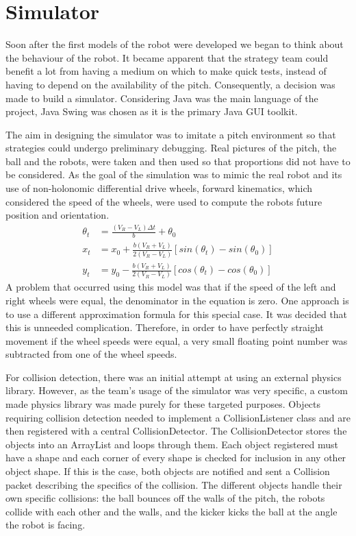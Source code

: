 \section{Simulator}

Soon after the first models of the robot were developed we began to think about the behaviour of the robot. It became apparent that the strategy team could benefit a lot from having a medium on which to make quick tests, instead of having to depend on the availability of the pitch. Consequently, a decision was made to build a simulator. Considering Java was the main language of the project, Java Swing was chosen as it is the primary Java GUI toolkit.\linebreak

The aim in designing the simulator was to imitate a pitch environment so that strategies could undergo preliminary debugging. Real pictures of the pitch, the ball and the robots, were taken and then used so that proportions did not have to be considered. As the goal of the simulation was to mimic the real robot and its use of  non-holonomic differential drive wheels, forward kinematics, which considered the speed of the wheels, were used to compute the robots future position and orientation.\linebreak
\begin{align}
\theta_{t} & = \frac{(V_{R}-V_{L})\Delta t}{b} + \theta_{0}\\
x_{t} & =x_0+ \frac{b(V_{R}+V_{L})}{2(V_{R}-V_{L})}[sin(\theta_{t})-sin(\theta_{0})]\\
y_{t} & =y_0- \frac{b(V_{R}+V_{L})}{2(V_{R}-V_{L})}[cos(\theta_{t})-cos(\theta_{0})]
\end{align}
A problem that occurred using this model was that if the speed of the left and right wheels were equal, the denominator in the equation is zero. One approach is to use a different approximation formula for this special case. It was decided that this is unneeded complication. Therefore, in order to have perfectly straight movement if the wheel speeds were equal, a very small floating point number was subtracted from one of the wheel speeds.\linebreak

For collision detection, there was an initial attempt at using an external physics library. However, as the team’s usage of the simulator was very specific, a custom made physics library was made purely for these targeted purposes. Objects requiring collision detection needed to implement a CollisionListener class and are then registered with a central CollisionDetector. The CollisionDetector stores the objects into an ArrayList and loops through them. Each object registered must have a shape and each corner of every shape is checked for inclusion in any other object shape. If this is the case, both objects are notified and sent a Collision packet describing the specifics of the collision. The different objects handle their own specific collisions: the ball bounces off the walls of the pitch, the robots collide with each other and the walls, and the kicker kicks the ball at the angle the robot is facing. \linebreak


